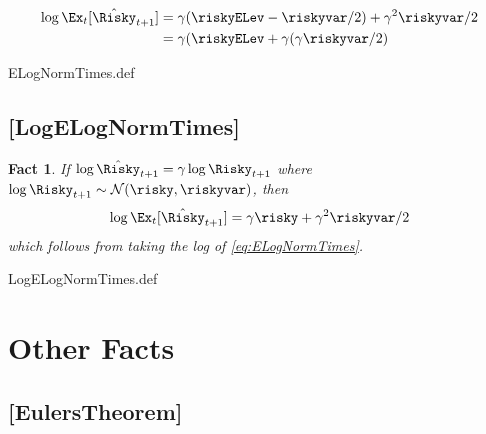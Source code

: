 \documentclass{handout}
\newtheorem{Fact}{Fact}
\begin{document}
\begin{equation}\begin{gathered}\begin{aligned}
  \log \Ex_{t}[\hat{\Risky}_{t+1}] & = {\gamma (\riskyELev-\riskyvar/2)+\gamma^{2}\riskyvar/2}
  \\ & = {\gamma (\riskyELev + \gamma (\gamma  \riskyvar/2)}
\end{aligned}\end{gathered}\end{equation}

\begin{verbatimwrite}{ELogNormTimes.def}
\providecommand{\ELogNormTimes}{\href{https://www.econ2.jhu.edu/people/ccarroll/public/LectureNotes/MathFacts/MathFactsList\#ELogNormTimes}{\ensuremath{\mathtt{[ELogNormTimes]}}}}
\end{verbatimwrite}

\hypertarget{LogELogNormTimes}{}
\subsection{[LogELogNormTimes]}

\begin{Fact} If $\log \hat{\Risky}_{t+1} = \gamma \log \Risky_{t+1}$ where $\log \Risky_{t+1} \sim \mathcal{N}(\risky,\riskyvar)$, then
\begin{equation}
        \log \Ex_{t}[\hat{\Risky}_{t+1}] = \gamma \risky+\gamma^{2}\riskyvar/2 \label{eq:LogELogNormTimes}
\end{equation}
which follows from taking the log of \eqref{eq:ELogNormTimes}.

\end{Fact}

\begin{verbatimwrite}{LogELogNormTimes.def}
\providecommand{\LogELogNormTimes}{\href{https://www.econ2.jhu.edu/people/ccarroll/public/LectureNotes/MathFacts/MathFactsList\#LogELogNormTimes}{\ensuremath{\mathtt{[LogELogNormTimes]}}}}
\end{verbatimwrite}




\section{Other Facts}

\hypertarget{EulersTheorem}{}
\subsection{[EulersTheorem]}\label{fact:EulersTheorem}
\end{document}
